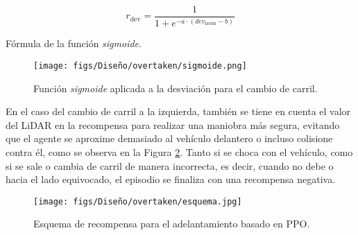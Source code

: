   \begin{myequation}[H]
    \begin{equation} 
       r_{\text{dev}} = \frac{1}{1 + e^{-a \cdot (dev_{\text{norm}} - b)}}
    \end{equation} 
    \caption{Fórmula de la función \textit{sigmoide}.}
\label{eq:sigmoid_deviation}
  \end{myequation}

\begin{figure}[ht]
\centering
\texttt{[image: figs/Diseño/overtaken/sigmoide.png]}
\caption{Función \textit{sigmoide} aplicada a la desviación para el cambio de carril.}
\label{fig:sigmoide}
\end{figure}

\newpage

En el caso del cambio de carril a la izquierda, también se tiene en cuenta el valor del \ac{LiDAR} en la recompensa para realizar una maniobra más segura, evitando que el agente se aproxime demasiado al vehículo delantero o incluso colisione contra él, como se observa en la Figura \ref{fig:esquema_over}. Tanto si se choca con el vehículo, como si se sale o cambia de carril de manera incorrecta, es decir, cuando no debe o hacia el lado equivocado, el episodio se finaliza con una recompensa negativa.
\begin{figure}[ht]
\centering
\texttt{[image: figs/Diseño/overtaken/esquema.jpg]}
\caption{Esquema de recompensa para el adelantamiento basado en \ac{PPO}.}
\label{fig:esquema_over}
\end{figure}

